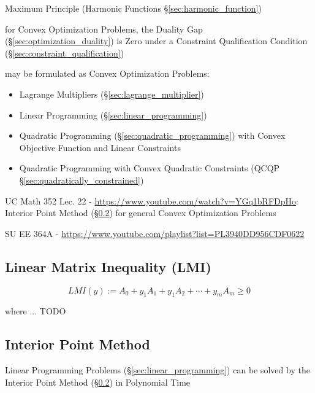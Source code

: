 Maximum Principle (Harmonic Functions \S\ref{sec:harmonic_function})

for Convex Optimization Problems, the Duality Gap
(\S\ref{sec:optimization_duality}) is Zero under a Constraint Qualification
Condition (\S\ref{sec:constraint_qualification})

may be formulated as Convex Optimization Problems:
\begin{itemize}
  \item Lagrange Multipliers (\S\ref{sec:lagrange_multiplier})
  \item Linear Programming (\S\ref{sec:linear_programming})
  \item Quadratic Programming (\S\ref{sec:quadratic_programming}) with Convex
    Objective Function and Linear Constraints
  \item Quadratic Programming with Convex Quadratic Constraints
    (QCQP \S\ref{sec:quadratically_constrained})
\end{itemize}

UC Math 352 Lec. 22 - \url{https://www.youtube.com/watch?v=YGq1bRFDpHo}:
Interior Point Method (\S\ref{sec:interior_point}) for general Convex
Optimization Problems

SU EE 364A - \url{https://www.youtube.com/playlist?list=PL3940DD956CDF0622}



\subsection{Linear Matrix Inequality (LMI)}\label{sec:lmi}

\[
  LMI(y) := A_0 + y_1A_1 + y_1A_2 + \cdots + y_mA_m \geq 0
\]

where ... TODO



\subsection{Interior Point Method}\label{sec:interior_point}

Linear Programming Problems (\S\ref{sec:linear_programming}) can be solved by
the Interior Point Method (\S\ref{sec:interior_point}) in Polynomial Time

